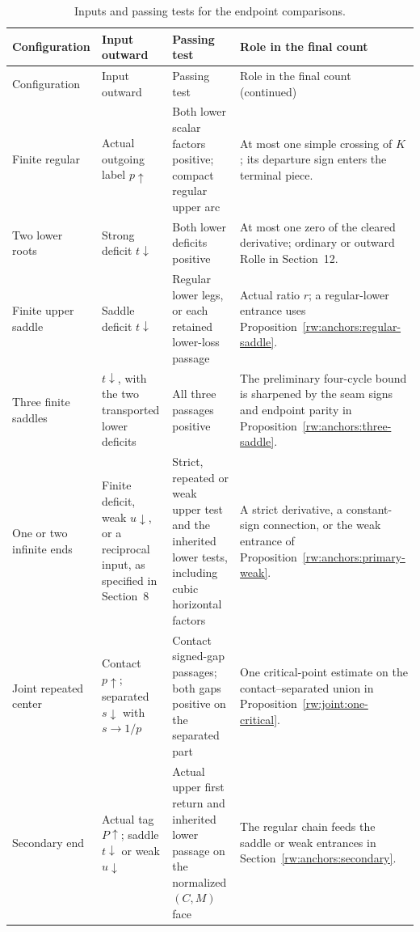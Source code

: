 \begin{center}\small
\setlength{\tabcolsep}{4pt}
\begin{longtable}{@{}p{.17\linewidth}p{.20\linewidth}p{.28\linewidth}p{.27\linewidth}@{}}
\caption{Inputs and passing tests for the endpoint comparisons.}
\label{rw:atlas:reading-map}\\
\toprule Configuration & Input outward & Passing test & Role in the final count\\\midrule
\endfirsthead
\toprule Configuration & Input outward & Passing test & Role in the final count (continued)\\\midrule
\endhead
\bottomrule\endfoot
Finite regular & Actual outgoing label $p\uparrow$ & Both lower scalar
factors positive; compact regular upper arc & At most one simple crossing of
$K$; its departure sign enters the terminal piece.\\\addlinespace
Two lower roots & Strong deficit $t\downarrow$ & Both lower deficits
positive & At most one zero of the cleared derivative; ordinary or outward
Rolle in Section~12.\\\addlinespace
Finite upper saddle & Saddle deficit $t\downarrow$ & Regular lower legs,
or each retained lower-loss passage & Actual ratio $r$; a regular-lower
entrance uses Proposition~\ref{rw:anchors:regular-saddle}.\\\addlinespace
Three finite saddles & $t\downarrow$, with the two transported lower
deficits & All three passages positive & The preliminary four-cycle
bound is sharpened by the seam signs and endpoint parity in
Proposition~\ref{rw:anchors:three-saddle}.\\\addlinespace
One or two infinite ends & Finite deficit, weak $u\downarrow$, or a
reciprocal input, as specified in Section~8 & Strict, repeated or weak
upper test and the inherited lower tests, including cubic horizontal
factors & A strict
derivative, a constant-sign connection, or the weak entrance of
Proposition~\ref{rw:anchors:primary-weak}.\\\addlinespace
Joint repeated center & Contact $p\uparrow$; separated $s\downarrow$
with $s\to1/p$ & Contact signed-gap passages; both gaps positive on the
separated part & One critical-point estimate on the contact--separated
union in Proposition~\ref{rw:joint:one-critical}.\\\addlinespace
Secondary end & Actual tag $P\uparrow$; saddle $t\downarrow$ or weak
$u\downarrow$ & Actual upper first return and inherited lower passage
on the normalized $(C,M)$ face & The regular chain feeds the saddle or
weak entrances in Section~\ref{rw:anchors:secondary}.\\
\end{longtable}
\end{center}

